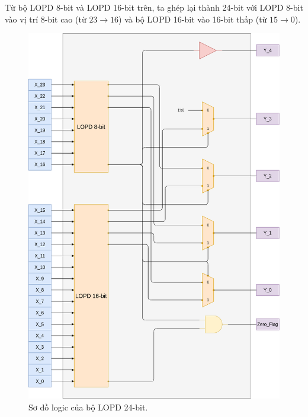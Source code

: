 Từ bộ LOPD 8-bit và LOPD 16-bit trên, ta ghép lại thành 24-bit với LOPD 8-bit vào vị trí 8-bit cao (từ $ 23 \rightarrow 16 $) và bộ LOPD 16-bit vào 16-bit thấp (từ $ 15 \rightarrow 0 $).

\begin{figure}[H]
	\centering
	\includegraphics[width=.8\linewidth]{./my-chapters/my-diagrams/Question2/LOPD_24bit.png}
	\caption{Sơ đồ logic của bộ LOPD 24-bit.}
\end{figure}










